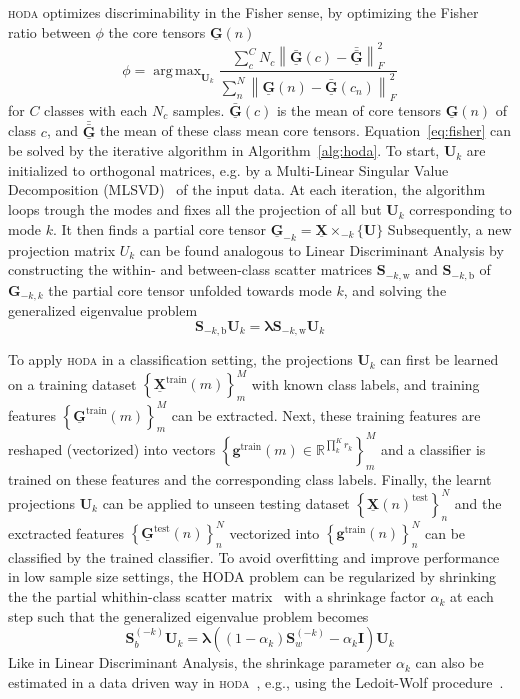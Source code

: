 \documentclass[twocolumn]{article}
\newcommand{\ten}[1]{\underline{\mathbf{#1}}} %
\newcommand{\mat}[1]{\mathbf{#1}} %
\renewcommand{\vec}[1]{\mathbf{#1}} %
\newcommand{\mmprs}[2]{\times_{-#2}\{#1\}} %
\DeclareMathOperator*{\argmax}{arg\,max}
\begin{document}
\textsc{hoda} optimizes discriminability in the Fisher sense, by optimizing the
Fisher ratio between $\phi$ the core tensors $\ten{G}(n)$
\begin{equation}
	\phi = \argmax_{\mat{U}_k}
	\frac{\sum_c^CN_c\left\lVert\bar{\ten{G}}(c)-\bar{\bar{\ten{G}}}\right\rVert_F^2}
	{\sum_n^N\left\lVert\ten{G}(n)-\bar{\ten{G}}(c_n)\right\rVert_F^2}
	\label{eq:fisher}
\end{equation}
for $C$ classes with each $N_c$ samples. $\bar{\ten{G}}(c)$ is the mean of core
tensors $\ten{G}(n)$ of class $c$, and $\bar{\bar{\ten{G}}}$ the mean of
these class mean core tensors.
Equation~\ref{eq:fisher} can be solved by the iterative algorithm in
Algorithm~\ref{alg:hoda}.
To start, $\mat{U}_k$ are initialized to orthogonal matrices, e.g. by a
Multi-Linear Singular Value Decomposition (MLSVD)~\cite{Lathauwer2000} of the input data.
At each iteration, the algorithm loops trough the modes and fixes all the
projection of all but $\mat{U}_k$ corresponding to mode $k$.
It then finds a partial core tensor $\ten{G}_{-k}=\ten{X}\mmprs{\mat{U}}{k}$
Subsequently, a new projection matrix $U_k$ can be found analogous to Linear
Discriminant Analysis by constructing the within- and between-class scatter
matrices $\mat{S}_{-k,\text{w}}$ and $\mat{S}_{-k,\text{b}}$ of
$\mat{G}_{-k,k}$ the partial core tensor unfolded towards mode $k$, and solving
the generalized eigenvalue problem
\begin{equation}
  \mat{S}_{-k,\text{b}}\mat{U}_k = \mat{\lambda}\mat{S}_{-k,\text{w}}\mat{U}_k
\end{equation}

To apply \textsc{hoda} in a classification setting, the projections $\mat{U}_k$
can first be learned on a training dataset
$\left\{\ten{X}^\text{train}(m)\right\}_m^M$ with known class labels, and
training features $\left\{\ten{G}^\text{train}(m)\right\}_m^M$ can be extracted.
Next, these training features are reshaped (vectorized) into vectors
$\left\{\vec{g}^\text{train}(m) \in \mathbb{R}^{\prod_k^Kr_k}\right\}_m^M$ and a classifier is
trained on these features and the corresponding class labels.
Finally, the learnt projections $\mat{U}_k$ can be applied to unseen testing
dataset $\left\{\ten{X}(n)^\text{test}\right\}_n^N$ and the exctracted features
$\left\{\ten{G}^\text{test}(n)\right\}_n^N$ vectorized into
$\left\{\vec{g}^\text{train}(n)\right\}_n^N$ can be
classified by the trained classifier.
To avoid overfitting and improve performance in low sample size settings, the
\textsc{HODA} problem can be regularized by shrinking the the partial
whithin-class scatter matrix~\cite{Phan2010} with a shrinkage factor
$\alpha_k$ at each step such that the generalized eigenvalue problem becomes
\begin{equation}
	\mat{S}_b^{(-k)}\mat{U}_k =
	\mat{\lambda}((1-\alpha_k)\mat{S}_w^{(-k)}-\alpha_k\mat{I})\mat{U}_k
\end{equation}
Like in Linear Discriminant Analysis, the shrinkage parameter $\alpha_k$ can
also be estimated in a data driven way in \textsc{hoda}~\cite{Jorajuria2022},
e.g., using the Ledoit-Wolf procedure~\cite{Ledoit2003}.
\end{document}

